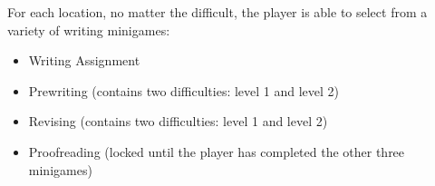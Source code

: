 For each location, no matter the difficult, the player is able to select from a variety of writing minigames:

\begin{itemize}
    \item Writing Assignment
    \item Prewriting (contains two difficulties: level 1 and level 2)
    \item Revising (contains two difficulties: level 1 and level 2)
    \item Proofreading (locked until the player has completed the other three minigames)
\end{itemize}
